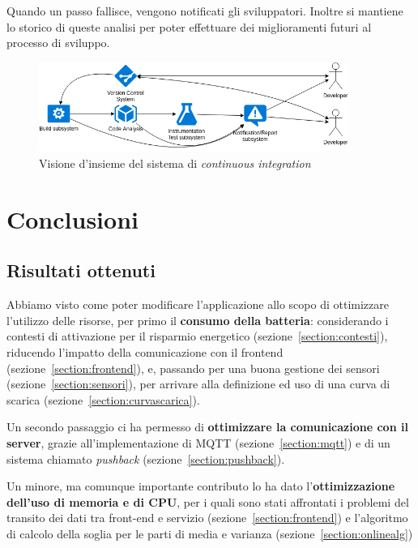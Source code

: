 \documentclass[a4paper,10pt]{memoir}
\begin{document}
Quando un passo fallisce, vengono notificati gli sviluppatori. Inoltre si mantiene lo storico di queste analisi per poter effettuare dei miglioramenti futuri al processo di sviluppo.

\begin{figure}[ht]
\centering
\includegraphics[width=0.9\textwidth]{dev/ci}
\caption{Visione d'insieme del sistema di \textit{continuous integration}}
\end{figure}

\chapter{Conclusioni}

\section{Risultati ottenuti}

Abbiamo visto come poter modificare l'applicazione allo scopo di ottimizzare l'utilizzo delle risorse, per primo il \textbf{consumo della batteria}: considerando i contesti di attivazione per il risparmio energetico (sezione~\ref{section:contesti}), riducendo l'impatto della comunicazione con il frontend (sezione~\ref{section:frontend}), e, passando per una buona gestione dei sensori (sezione~\ref{section:sensori}), per arrivare alla definizione ed uso di una curva di scarica (sezione~\ref{section:curvascarica}).

\medskip

Un secondo passaggio ci ha permesso di \textbf{ottimizzare la comunicazione con il server}, grazie all'implementazione di MQTT (sezione~\ref{section:mqtt}) e di un sistema chiamato \textit{pushback} (sezione~\ref{section:pushback}).

\medskip

Un minore, ma comunque importante contributo lo ha dato l'\textbf{ottimizzazione dell'uso di memoria e di CPU}, per i quali sono stati affrontati i problemi del transito dei dati tra front-end e servizio (sezione~\ref{section:frontend}) e l'algoritmo di calcolo della soglia per le parti di media e varianza (sezione~\ref{section:onlinealg})
\end{document}
